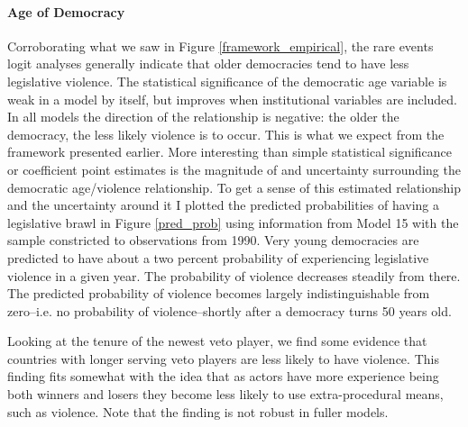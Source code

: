 \documentclass[a4paper]{article}\usepackage{graphicx, color}
\begin{document}
\paragraph{Age of Democracy}
Corroborating what we saw in Figure \ref{framework_empirical}, the rare events logit analyses generally indicate that older democracies tend to have less legislative violence. The statistical significance of the democratic age variable is weak in a model by itself, but improves when institutional variables are included. In all models the direction of the relationship is negative: the older the democracy, the less likely violence is to occur. This is what we expect from the framework presented earlier. More interesting than simple statistical significance or coefficient point estimates is the magnitude of and uncertainty surrounding the democratic age/violence relationship. To get a sense of this estimated relationship and the uncertainty around it \citep[see][]{King2000} I plotted the predicted probabilities of having a legislative brawl in Figure \ref{pred_prob} using information from Model 15 with the sample constricted to observations from 1990. Very young democracies are predicted to have about a two percent probability of experiencing legislative violence in a given year. The probability of violence decreases steadily from there. The predicted probability of violence becomes largely indistinguishable from zero--i.e. no probability of violence--shortly after a democracy turns 50 years old.

Looking at the tenure of the newest veto player, we find some evidence that countries with longer serving veto players are less likely to have violence. This finding fits somewhat with the idea that as actors have more experience being both winners and losers they become less likely to use extra-procedural means, such as violence. Note that the finding is not robust in fuller models.
\end{document}
